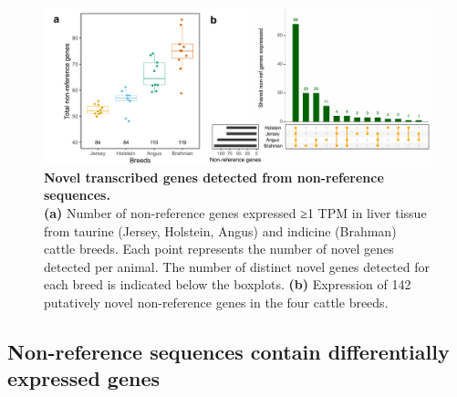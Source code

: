 \documentclass[../main.tex]{subfiles}
\begin{document}
\begin{figure}[!htb]
    \centering
    \includegraphics[width=\textwidth]{paper3/main_figure/Fig3.pdf}
        \caption[Transcription of novel genes]{\textbf{Novel transcribed genes detected from non-reference sequences.} \\
        \footnotesize{\textbf{(a)} Number of non-reference genes expressed ≥1 TPM in liver tissue from taurine (Jersey, Holstein, Angus) and indicine (Brahman) cattle breeds. Each point represents the number of novel genes detected per animal. The number of distinct novel genes detected for each breed is indicated below the boxplots. \textbf{(b)} Expression of 142 putatively novel non-reference genes in the four cattle breeds.}}
        \label{fig43:rnanov}
\end{figure}

\subsection*{Non-reference sequences contain differentially expressed genes}
\end{document}
